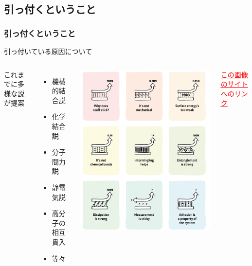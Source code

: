 \documentclass[unicode,12pt]{beamer}%
\begin{document}
\subsection{引っ付くということ}
\begin{frame}
	\frametitle{引っ付くということ}
	
	\begin{block}{引っ付いている原因について}
		\begin{columns}[c, onlytextwidth]
			これまでに多様な説が提案
				\begin{itemize}
					\item 機械的結合説
					\item 化学結合説
					\item 分子間力説
					\item 静電気説
					\item 高分子の相互貫入
					\item 等々
				\end{itemize}
			\centering
			\includegraphics[width=.85\textwidth]{Adhesion_Overview.png}

			\vspace{-2mm}
				\href{https://www.stevenabbott.co.uk/practical-adhesion/}{\textcolor{red}{\underline{\scriptsize{この画像のサイトへのリンク}}}}
		\end{columns}
	\end{block}
\end{frame}
\end{document}
